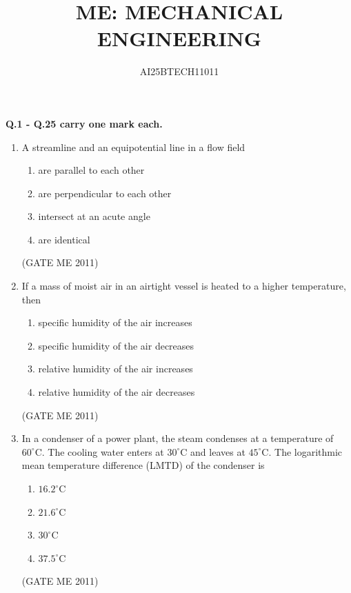\documentclass[journal]{IEEEtran}
\begin{document}
\title{
ME: MECHANICAL ENGINEERING}
\author{AI25BTECH11011}
\maketitle
\renewcommand{\thefigure}{\theenumi}
\renewcommand{\thetable}{\theenumi}

\textbf{Q.1 - Q.25 carry one mark each.}

\begin{enumerate}

\item A streamline and an equipotential line in a flow field
\begin{enumerate}
\item are parallel to each other  
\item are perpendicular to each other  
\item intersect at an acute angle  
\item are identical  
\end{enumerate}
\hfill (GATE ME 2011)

\item If a mass of moist air in an airtight vessel is heated to a higher temperature, then
\begin{enumerate}
\item specific humidity of the air increases  
\item specific humidity of the air decreases  
\item relative humidity of the air increases  
\item relative humidity of the air decreases  
\end{enumerate}
\hfill (GATE ME 2011)

\item In a condenser of a power plant, the steam condenses at a temperature of $60^\circ\text{C}$. The cooling water enters at $30^\circ\text{C}$ and leaves at $45^\circ\text{C}$. The logarithmic mean temperature difference (LMTD) of the condenser is
\begin{multicols}{4}
\begin{enumerate}
\item $16.2^\circ\text{C}$  
\item $21.6^\circ\text{C}$  
\item $30^\circ\text{C}$  
\item $37.5^\circ\text{C}$  
\end{enumerate}
\end{multicols} 
\hfill (GATE ME 2011)              


\end{enumerate}
\end{document}
